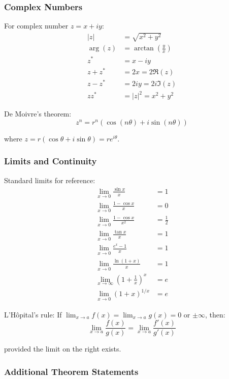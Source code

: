 \documentclass[12pt]{article}
\begin{document}
\subsubsection{Complex Numbers}

For complex number $z = x + iy$:
\begin{align}
|z| &= \sqrt{x^2 + y^2} \\
\arg(z) &= \arctan\left(\frac{y}{x}\right) \\
z^* &= x - iy \\
z + z^* &= 2x = 2\Re(z) \\
z - z^* &= 2iy = 2i\Im(z) \\
zz^* &= |z|^2 = x^2 + y^2
\end{align}

De Moivre's theorem:
\begin{equation}
z^n = r^n(\cos(n\theta) + i\sin(n\theta))
\end{equation}

where $z = r(\cos\theta + i\sin\theta) = re^{i\theta}$.

\subsubsection{Limits and Continuity}

Standard limits for reference:
\begin{align}
\lim_{x \to 0} \frac{\sin x}{x} &= 1 \\
\lim_{x \to 0} \frac{1 - \cos x}{x} &= 0 \\
\lim_{x \to 0} \frac{1 - \cos x}{x^2} &= \frac{1}{2} \\
\lim_{x \to 0} \frac{\tan x}{x} &= 1 \\
\lim_{x \to 0} \frac{e^x - 1}{x} &= 1 \\
\lim_{x \to 0} \frac{\ln(1 + x)}{x} &= 1 \\
\lim_{x \to \infty} \left(1 + \frac{1}{x}\right)^x &= e \\
\lim_{x \to 0} (1 + x)^{1/x} &= e
\end{align}

L'Hôpital's rule: If $\lim_{x \to a} f(x) = \lim_{x \to a} g(x) = 0$ or $\pm\infty$, then:
\begin{equation}
\lim_{x \to a} \frac{f(x)}{g(x)} = \lim_{x \to a} \frac{f'(x)}{g'(x)}
\end{equation}

provided the limit on the right exists.

\subsubsection{Additional Theorem Statements}
\end{document}
